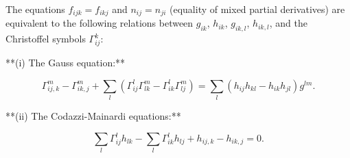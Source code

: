 The equations $f_{ijk} = f_{ikj}$ and $n_{ij} = n_{ji}$ (equality of mixed partial derivatives) are equivalent to the following relations between $g_{ik}$, $h_{ik}$, $g_{ik,l}$, $h_{ik,l}$, and the Christoffel symbols $\Gamma_{ij}^k$:

**(i) The Gauss equation:**

$$
\Gamma_{ij,k}^m - \Gamma_{ik,j}^m + \sum_l (\Gamma_{ij}^l \Gamma_{lk}^m - \Gamma_{ik}^l \Gamma_{lj}^m) = \sum_l (h_{ij} h_{kl} - h_{ik} h_{jl}) g^{lm}.
$$

**(ii) The Codazzi-Mainardi equations:**

$$
\sum_l \Gamma_{ij}^l h_{lk} - \sum_l \Gamma_{ik}^l h_{lj} + h_{ij,k} - h_{ik,j} = 0.
$$
